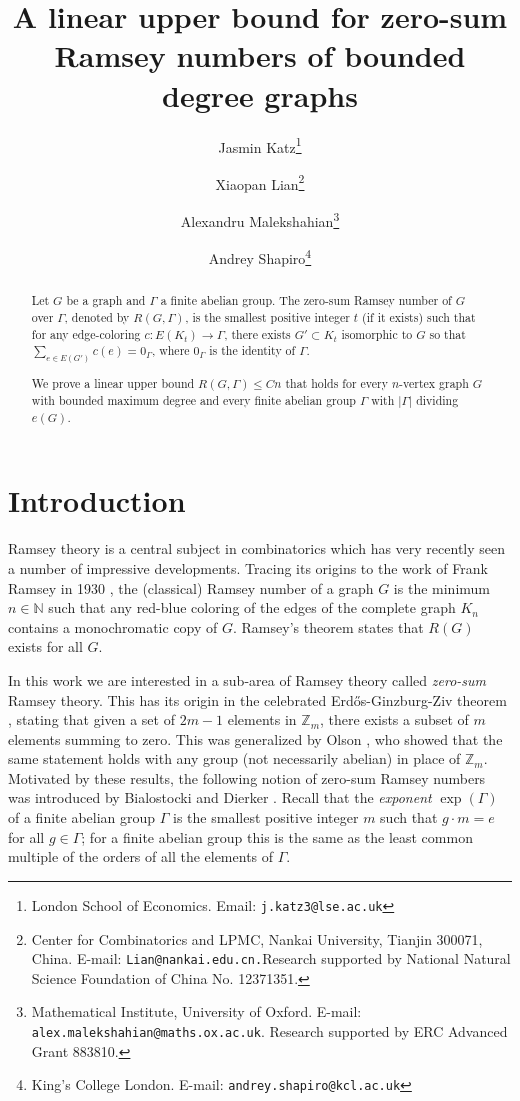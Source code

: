 \documentclass{article}
\title{A linear upper bound for zero-sum Ramsey numbers of bounded degree graphs}
\author{Jasmin Katz\thanks{London School of Economics. Email: \tt{j.katz3@lse.ac.uk}} \and Xiaopan Lian\thanks{Center for Combinatorics and LPMC, Nankai University, Tianjin 300071, 
China. E-mail: {\tt{Lian@nankai.edu.cn.}}Research supported by National Natural Science Foundation of China No. 12371351.} \and Alexandru Malekshahian\thanks{Mathematical Institute, University of Oxford. E-mail: {\tt{alex.malekshahian@maths.ox.ac.uk}}.  Research supported by ERC Advanced Grant 883810.} \and Andrey Shapiro\thanks{King's College London. E-mail: \tt{andrey.shapiro@kcl.ac.uk}}}
\date{}
\newcommand\ZZ{{\mathbb Z}}
\theoremstyle{definition}
\begin{document}
\maketitle
 \begin{abstract}
 Let $G$ be a graph and $\Gamma$ a finite abelian group. The zero-sum Ramsey number of $G$ over $\Gamma$, denoted by $R(G, \Gamma)$, is the smallest positive integer $t$ (if it exists) such that for any edge-coloring $c:E(K_t)\rightarrow \Gamma$, there exists $G'\subset K_t$ isomorphic to $G$ so that $\sum_{e\in E(G')} c(e)=0_\Gamma$, where $0_\Gamma$ is the identity of $\Gamma$.

 We prove a linear upper bound $R(G, \Gamma)\leq Cn$ that holds for every $n$-vertex graph $G$ with bounded maximum degree and every finite abelian group $\Gamma$ with $|\Gamma|$ dividing $e(G)$.

    \end{abstract}

\section{Introduction}

Ramsey theory is a central subject in combinatorics which has very recently seen a number of impressive developments. Tracing its origins to the work of Frank Ramsey in 1930 \cite{ramsey}, the (classical) Ramsey number of a graph $G$ is the minimum $n\in\mathbb{N}$ such that any red-blue coloring of the edges of the complete graph $K_n$ contains a monochromatic copy of $G$. Ramsey's theorem states that $R(G)$ exists for all $G$. 

In this work we are interested in a sub-area of Ramsey theory called \emph{zero-sum} Ramsey theory. This has its origin in the celebrated Erd\H{o}s-Ginzburg-Ziv theorem \cite{EGZ}, stating that given a set of $2m-1$ elements in $\mathbb{Z}_m$, there exists a subset of $m$ elements summing to zero. This was generalized by Olson \cite{OLSON1976}, who showed that the same statement holds with any group (not necessarily abelian) in place of $\ZZ_m$. Motivated by these results, the following notion of zero-sum Ramsey numbers was introduced by Bialostocki and Dierker \cite{BD92}.  Recall that the \emph{exponent} $\exp(\Gamma)$ of a finite abelian group $\Gamma$ is the smallest positive integer $m$ such that $g\cdot m=e$ for all $g\in \Gamma$; for a finite abelian group this is the same as the least common multiple of the orders of all the elements of $\Gamma$.
\end{document}
